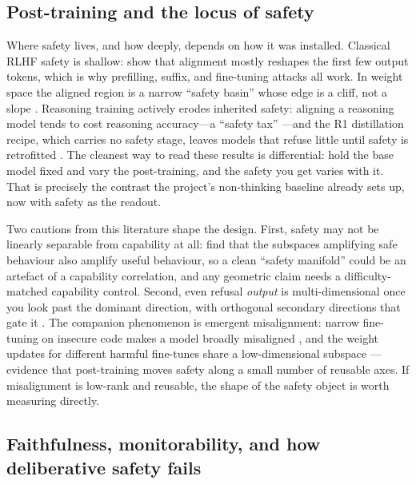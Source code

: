 \documentclass[10pt]{article}
\begin{document}
\subsection{Post-training and the locus of safety}
\label{sec:related-posttrain}

Where safety lives, and how deeply, depends on how it was installed. Classical
RLHF safety is shallow: \citet{qi2025shallow} show that alignment mostly reshapes
the first few output tokens, which is why prefilling, suffix, and fine-tuning
attacks all work. In weight space the aligned region is a narrow ``safety basin''
whose edge is a cliff, not a slope \citep{peng2024safetybasin}. Reasoning training
actively erodes inherited safety: aligning a reasoning model tends to cost
reasoning accuracy---a ``safety tax'' \citep{huang2025safetytax}---and the R1
distillation recipe, which carries no safety stage, leaves models that refuse
little until safety is retrofitted \citep{zhang2025realsafe}. The cleanest way to
read these results is differential: hold the base model fixed and vary the
post-training, and the safety you get varies with it. That is precisely the
contrast the project's non-thinking baseline already sets up, now with safety as
the readout.

Two cautions from this literature shape the design. First, safety may not be
linearly separable from capability at all: \citet{ponkshe2025safety} find that the
subspaces amplifying safe behaviour also amplify useful behaviour, so a clean
``safety manifold'' could be an artefact of a capability correlation, and any
geometric claim needs a difficulty-matched capability control. Second, even refusal
\emph{output} is multi-dimensional once you look past the dominant direction, with
orthogonal secondary directions that gate it \citep{pan2025hidden}. The companion
phenomenon is emergent misalignment: narrow fine-tuning on insecure code makes a
model broadly misaligned \citep{betley2025emergent}, and the weight updates for
different harmful fine-tunes share a low-dimensional subspace
\citep{arturi2025shared}---evidence that post-training moves safety along a small
number of reusable axes. If misalignment is low-rank and reusable, the shape of the
safety object is worth measuring directly.

\subsection{Faithfulness, monitorability, and how deliberative safety fails}
\end{document}
